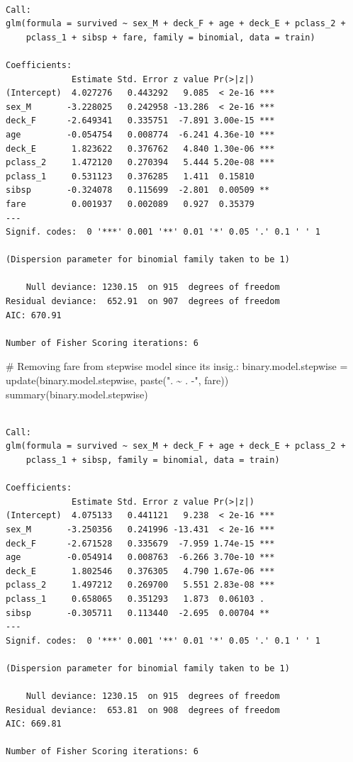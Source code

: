 \documentclass[
  letterpaper,
  DIV=11,
  numbers=noendperiod]{scrartcl}
\newenvironment{Shaded}{\begin{snugshade}}{\end{snugshade}}
\newcommand{\CommentTok}[1]{\textcolor[rgb]{0.37,0.37,0.37}{#1}}
\newcommand{\FunctionTok}[1]{\textcolor[rgb]{0.28,0.35,0.67}{#1}}
\newcommand{\NormalTok}[1]{\textcolor[rgb]{0.00,0.23,0.31}{#1}}
\newcommand{\OtherTok}[1]{\textcolor[rgb]{0.00,0.23,0.31}{#1}}
\newcommand{\StringTok}[1]{\textcolor[rgb]{0.13,0.47,0.30}{#1}}
\begin{document}
\begin{verbatim}

Call:
glm(formula = survived ~ sex_M + deck_F + age + deck_E + pclass_2 + 
    pclass_1 + sibsp + fare, family = binomial, data = train)

Coefficients:
             Estimate Std. Error z value Pr(>|z|)    
(Intercept)  4.027276   0.443292   9.085  < 2e-16 ***
sex_M       -3.228025   0.242958 -13.286  < 2e-16 ***
deck_F      -2.649341   0.335751  -7.891 3.00e-15 ***
age         -0.054754   0.008774  -6.241 4.36e-10 ***
deck_E       1.823622   0.376762   4.840 1.30e-06 ***
pclass_2     1.472120   0.270394   5.444 5.20e-08 ***
pclass_1     0.531123   0.376285   1.411  0.15810    
sibsp       -0.324078   0.115699  -2.801  0.00509 ** 
fare         0.001937   0.002089   0.927  0.35379    
---
Signif. codes:  0 '***' 0.001 '**' 0.01 '*' 0.05 '.' 0.1 ' ' 1

(Dispersion parameter for binomial family taken to be 1)

    Null deviance: 1230.15  on 915  degrees of freedom
Residual deviance:  652.91  on 907  degrees of freedom
AIC: 670.91

Number of Fisher Scoring iterations: 6
\end{verbatim}

\begin{Shaded}
\begin{Highlighting}[]
\CommentTok{\# Removing fare from stepwise model since its insig.:}
\NormalTok{binary.model.stepwise }\OtherTok{=} \FunctionTok{update}\NormalTok{(binary.model.stepwise, }\FunctionTok{paste}\NormalTok{(}\StringTok{". \textasciitilde{} . {-}"}\NormalTok{, }\StringTok{\textquotesingle{}fare\textquotesingle{}}\NormalTok{))}
\FunctionTok{summary}\NormalTok{(binary.model.stepwise)}
\end{Highlighting}
\end{Shaded}

\begin{verbatim}

Call:
glm(formula = survived ~ sex_M + deck_F + age + deck_E + pclass_2 + 
    pclass_1 + sibsp, family = binomial, data = train)

Coefficients:
             Estimate Std. Error z value Pr(>|z|)    
(Intercept)  4.075133   0.441121   9.238  < 2e-16 ***
sex_M       -3.250356   0.241996 -13.431  < 2e-16 ***
deck_F      -2.671528   0.335679  -7.959 1.74e-15 ***
age         -0.054914   0.008763  -6.266 3.70e-10 ***
deck_E       1.802546   0.376305   4.790 1.67e-06 ***
pclass_2     1.497212   0.269700   5.551 2.83e-08 ***
pclass_1     0.658065   0.351293   1.873  0.06103 .  
sibsp       -0.305711   0.113440  -2.695  0.00704 ** 
---
Signif. codes:  0 '***' 0.001 '**' 0.01 '*' 0.05 '.' 0.1 ' ' 1

(Dispersion parameter for binomial family taken to be 1)

    Null deviance: 1230.15  on 915  degrees of freedom
Residual deviance:  653.81  on 908  degrees of freedom
AIC: 669.81

Number of Fisher Scoring iterations: 6
\end{verbatim}
\end{document}
